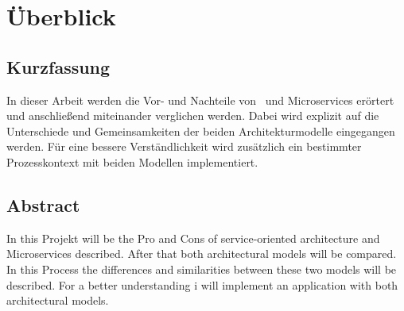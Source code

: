\chapter*{Überblick}
\section*{Kurzfassung}
In dieser Arbeit werden die Vor- und Nachteile von \SOA\ und Microservices erörtert und anschließend miteinander verglichen werden. Dabei wird explizit auf die Unterschiede und Gemeinsamkeiten der beiden Architekturmodelle eingegangen werden. Für eine bessere Verständlichkeit wird zusätzlich ein bestimmter Prozesskontext mit beiden Modellen implementiert.

\section*{Abstract}
In this Projekt will be the Pro and Cons of service-oriented architecture and Microservices described. After that both architectural models will be compared. In this Process the differences and similarities between these two models will be described. For a better understanding i will implement an application with both architectural models.